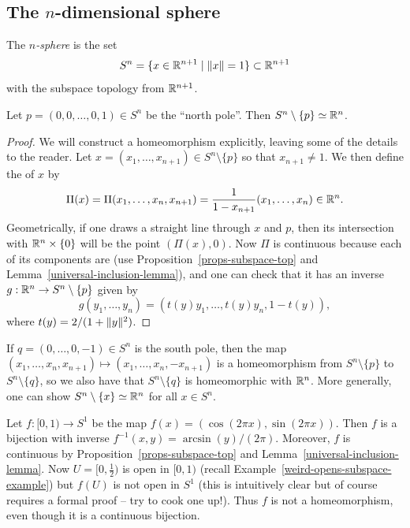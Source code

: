 \subsection{The $n$-dimensional sphere}
\begin{defn}
  The \emph{$n$-sphere} is the set
  \[
    S^n = \{ x \in \mathbb{R}^{n+1} \mid \lVert x \rVert = 1 \} \subset \mathbb{R}^{n+1}
  \]
  with the subspace topology from $\mathbb{R}^{n+1}$.
\end{defn}
\begin{prop}
  \label{north-pole-removed}
  Let $p = (0,0,\dots,0,1) \in S^n$ be the ``north pole''. Then $S^n \setminus \{p\} \simeq \mathbb{R}^n$.
\end{prop}
\begin{proof}
  We will construct a homeomorphism explicitly, leaving some of the details to the reader. Let $x = (x_1, \dots, x_{n+1}) \in S^n \setminus \{ p \}$ so that $x_{n+1} \not= 1$. We then define the  of $x$ by
  \[
    \Pi(x) = \Pi(x_1,\dots,x_n,x_{n+1}) = \frac{1}{1-x_{n+1}} (x_1, \dots, x_n) \in \mathbb{R}^n.
  \]
  Geometrically, if one draws a straight line through $x$ and $p$, then its intersection with $\mathbb{R}^n \times \{0 \}$ will be the point $(\Pi(x),0)$. Now $\Pi$ is continuous because each of its components are (use Proposition~\ref{props-subspace-top} and Lemma~\ref{universal-inclusion-lemma}), and one can check that it has an inverse $g : \mathbb{R}^n \to S^n \setminus \{p \}$ given by
  \[
    g(y_1, \dots, y_n) = (t(y) y_1, \dots, t(y)y_n, 1-t(y)),
  \]
  where $t(y) = 2/(1+\lVert y \rVert^2)$.
\end{proof}
\begin{rem}
  \label{south-pole-removed}
  If $q = (0,\dots,0,-1) \in S^n$ is the south pole, then the map $(x_1, \dots, x_n,x_{n+1}) \mapsto (x_1,\dots,x_n,-x_{n+1})$ is a homeomorphism from $S^n \setminus \{p\}$ to $S^n \setminus \{ q \}$, so we also have that $S^n \setminus \{ q \}$ is homeomorphic with $\mathbb{R}^n$. More generally, one can show $S^n \setminus \{x\} \simeq \mathbb{R}^n$ for all $x \in S^n$.
\end{rem}
\begin{example}
  Let $f : [0,1) \to S^1$ be the map $f(x) = (\cos (2\pi x), \sin(2\pi x))$. Then $f$ is a bijection with inverse $f^{-1}(x,y) = \arcsin(y)/(2\pi)$. Moreover, $f$ is continuous by Proposition~\ref{props-subspace-top} and Lemma~\ref{universal-inclusion-lemma}. Now $U = [0,\tfrac{1}{2})$ is open in $[0,1)$ (recall Example~\ref{weird-opens-subspace-example}) but $f(U)$ is not open in $S^1$ (this is intuitively clear but of course requires a formal proof -- try to cook one up!). Thus $f$ is not a homeomorphism, even though it is a continuous bijection.
\end{example}

